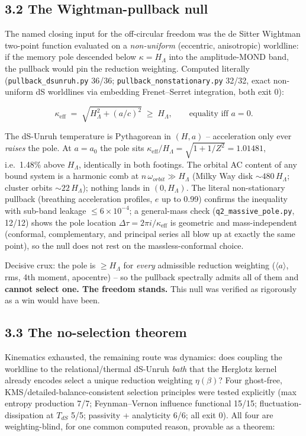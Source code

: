 \documentclass[
]{article}
\begin{document}
\subsection{3.2 The Wightman-pullback
null}\label{the-wightman-pullback-null}

The named closing input for the off-circular freedom was the de Sitter
Wightman two-point function evaluated on a \emph{non-uniform}
(eccentric, anisotropic) worldline: if the memory pole descended below
\(\kappa = H_\Lambda\) into the amplitude-MOND band, the pullback would
pin the reduction weighting. Computed literally
(\texttt{pullback\_dsunruh.py} 36/36;
\texttt{pullback\_nonstationary.py} 32/32, exact non-uniform dS
worldlines via embedding Frenet--Serret integration, both exit 0):

\[ \kappa_{\mathrm{eff}} \;=\; \sqrt{H_\Lambda^2 + (a/c)^2} \;\ge\; H_\Lambda, \qquad \text{equality iff } a = 0. \]

The dS-Unruh temperature is Pythagorean in \((H, a)\) -- acceleration
only ever \emph{raises} the pole. At \(a = a_0\) the pole sits
\(\kappa_{\mathrm{eff}}/H_\Lambda = \sqrt{1 + 1/Z^2} = 1.01481\), i.e.~1.48\%
above \(H_\Lambda\), identically in both footings. The orbital AC
content of any bound system is a harmonic comb at
\(n\,\omega_{orbit} \gg H_\Lambda\) (Milky Way disk
\(\sim 480\, H_\Lambda\); cluster orbits \(\sim 22\, H_\Lambda\));
nothing lands in \((0, H_\Lambda)\). The literal non-stationary pullback
(breathing acceleration profiles, \(e\) up to 0.99) confirms the
inequality with sub-band leakage \(\le 6 \times 10^{-4}\); a
general-mass check (\texttt{q2\_massive\_pole.py}, 12/12) shows the pole
location \(\Delta\tau = 2\pi i/\kappa_{\mathrm{eff}}\) is geometric and
mass-independent (conformal, complementary, and principal series all
blow up at exactly the same point), so the null does not rest on the
massless-conformal choice.

Decisive crux: the pole is \(\ge H_\Lambda\) for \emph{every} admissible
reduction weighting (\(\langle a \rangle\), rms, 4th moment, apocentre)
-- so the pullback spectrally admits all of them and \textbf{cannot
select one. The freedom stands.} This null was verified as rigorously as
a win would have been.

\subsection{3.3 The no-selection
theorem}\label{the-no-selection-theorem}

Kinematics exhausted, the remaining route was dynamics: does coupling
the worldline to the relational/thermal dS-Unruh \emph{bath} that the
Herglotz kernel already encodes select a unique reduction weighting
\(\eta(\beta)\)? Four ghost-free, KMS/detailed-balance-consistent
selection principles were tested explicitly (max entropy production 7/7;
Feynman--Vernon influence functional 15/15; fluctuation-dissipation at
\(T_{dS}\) 5/5; passivity + analyticity 6/6; all exit 0). All four are
weighting-blind, for one common computed reason, provable as a theorem:
\end{document}
